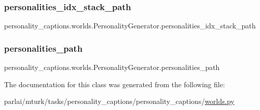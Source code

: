 \subsubsection{\texorpdfstring{personalities\+\_\+idx\+\_\+stack\+\_\+path}{personalities\_idx\_stack\_path}}
{\footnotesize\ttfamily personality\+\_\+captions.\+worlds.\+Personality\+Generator.\+personalities\+\_\+idx\+\_\+stack\+\_\+path}

\mbox{\label{classpersonality__captions_1_1worlds_1_1PersonalityGenerator_aab870fd5462e825716eb0e2a996671e2}} 
\subsubsection{\texorpdfstring{personalities\+\_\+path}{personalities\_path}}
{\footnotesize\ttfamily personality\+\_\+captions.\+worlds.\+Personality\+Generator.\+personalities\+\_\+path}



The documentation for this class was generated from the following file\+:\begin{DoxyCompactItemize}
\item 
parlai/mturk/tasks/personality\+\_\+captions/personality\+\_\+captions/\hyperlink{parlai_2mturk_2tasks_2personality__captions_2personality__captions_2worlds_8py}{worlds.\+py}\end{DoxyCompactItemize}
